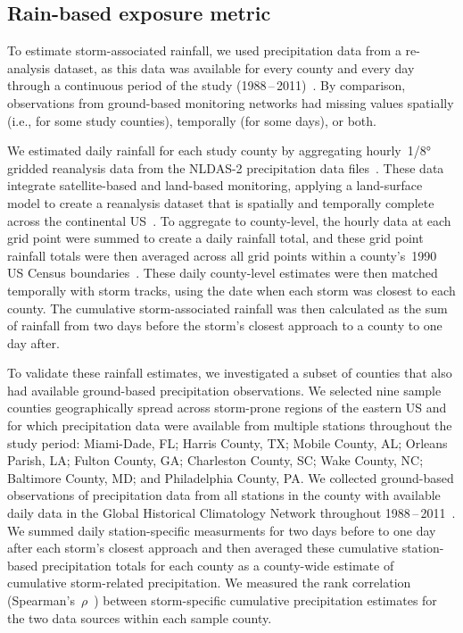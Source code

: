 \subsection*{Rain-based exposure metric}

To estimate storm-associated rainfall, we used precipitation data from a
re-analysis dataset, as this data was available for every county and every day
through a continuous period of the study
(1988\,--\,2011)~\parencite{alhamdan2014environmental, cdcwonder}.  By
comparison, observations from ground-based monitoring networks had missing
values spatially (i.e., for some study counties), temporally (for some days),
or both.  

We estimated daily rainfall for each study county by aggregating
hourly~1/8\si{\degree} gridded reanalysis data from the \ac{NLDAS-2}
precipitation data files~\parencite{rui2013nldas}. These data integrate
satellite-based and land-based monitoring, applying a land-surface model to
create a reanalysis dataset that is spatially and temporally complete across
the continental \ac{US}~\parencite{rui2013nldas, alhamdan2014environmental}. To
aggregate to county-level, the hourly data at each grid point were summed to
create a daily rainfall total, and these grid point rainfall totals were then
averaged across all grid points within a county's~1990 \ac{US} Census
boundaries~\parencite{alhamdan2014environmental, cdcwonder}. These daily
county-level estimates were then matched temporally with storm tracks, using
the date when each storm was closest to each county. The cumulative
storm-associated rainfall was then calculated as the sum of rainfall from two
days before the storm's closest approach to a county to one day after. 

To validate these rainfall estimates, we investigated a subset of counties that
also had available ground-based precipitation observations. We selected nine
sample counties geographically spread across storm-prone regions of the eastern
\ac{US} and for which precipitation data were available from multiple stations
throughout the study period: Miami-Dade, FL; Harris County, TX; Mobile County,
AL; Orleans Parish, LA; Fulton County, GA; Charleston County, SC; Wake County,
NC; Baltimore County, MD; and Philadelphia County, PA. We collected
ground-based observations of precipitation data from all stations in the county
with available daily data in the Global Historical Climatology Network
throughout 1988\,--\,2011~\parencite{menne2012overview, rnoaa, countyweather}.
We summed daily station-specific measurments for two days before to one day
after each storm's closest approach and then averaged these cumulative
station-based precipitation totals for each county as a county-wide estimate of
cumulative storm-related precipitation. We measured the rank correlation
(Spearman's~$\rho$~\parencite{spearman1904proof}) between storm-specific
cumulative precipitation estimates for the two data sources within each sample
county.

